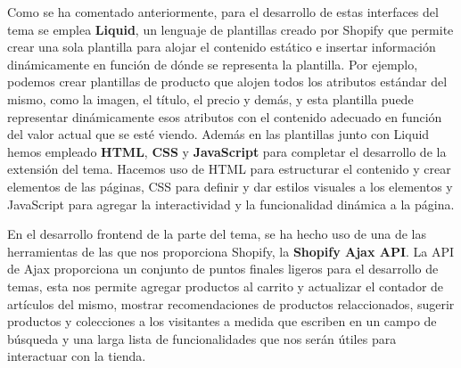 \documentclass[12pt]{article}
\begin{document}
Como se ha comentado anteriormente, para el desarrollo de estas interfaces del tema se emplea \textbf{Liquid}, un lenguaje de plantillas creado por Shopify que
permite crear una sola plantilla para alojar el contenido estático e insertar información dinámicamente en función de dónde se representa la plantilla.
Por ejemplo, podemos crear plantillas de producto que alojen todos los atributos estándar del mismo, como la imagen, el título, el precio y demás, y esta 
plantilla puede representar dinámicamente esos atributos con el contenido adecuado en función del valor actual que se esté viendo. \cite{shopify-dev}
Además en las plantillas junto con Liquid hemos empleado \textbf{HTML}, \textbf{CSS} y \textbf{JavaScript} para completar el desarrollo de la extensión del tema. Hacemos uso de HTML para estructurar
el contenido y crear elementos de las páginas, CSS para definir y dar estilos visuales a los elementos y JavaScript para agregar la interactividad y la 
funcionalidad dinámica a la página. 

En el desarrollo frontend de la parte del tema, se ha hecho uso de una de las herramientas de las que nos proporciona Shopify, la \textbf{Shopify Ajax API}. La API de Ajax
proporciona un conjunto de puntos finales ligeros para el desarrollo de temas, esta nos permite agregar productos al carrito y actualizar el contador
de artículos del mismo, mostrar recomendaciones de productos relaccionados, sugerir productos y colecciones a los visitantes a medida que escriben
en un campo de búsqueda y una larga lista de funcionalidades que nos serán útiles para interactuar con la tienda.\cite{shopify-dev}
\end{document}
